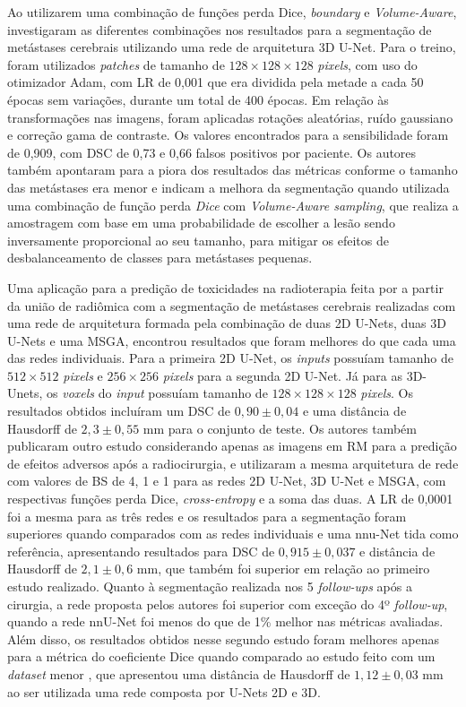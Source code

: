 Ao utilizarem uma combinação de funções perda Dice, \textit{boundary} e \textit{Volume-Aware}, \cite{Chartrand:2022} investigaram as diferentes combinações nos resultados para a segmentação de metástases cerebrais utilizando uma rede de arquitetura 3D U-Net. Para o treino, foram utilizados \textit{patches} de tamanho de $128\times128\times128$ \textit{pixels}, com uso do otimizador Adam, com LR de 0,001 que era dividida pela metade a cada 50 épocas sem variações, durante um total de 400 épocas. Em relação às transformações nas imagens, foram aplicadas rotações aleatórias, ruído gaussiano e correção gama de contraste. Os valores encontrados para a sensibilidade foram de 0,909, com DSC de 0,73 e 0,66 falsos positivos por paciente. Os autores também apontaram para a piora dos resultados das métricas conforme o tamanho das metástases era menor e indicam a melhora da segmentação quando utilizada uma combinação de função perda \textit{Dice} com \textit{Volume-Aware sampling}, que realiza a amostragem com base em uma probabilidade de escolher a lesão sendo inversamente proporcional ao seu tamanho, para mitigar os efeitos de desbalanceamento de classes para metástases pequenas.

Uma aplicação para a predição de toxicidades na radioterapia feita por \cite{Jalalifar:2022} a partir da união de radiômica com a segmentação de metástases cerebrais realizadas com uma rede de arquitetura formada pela combinação de duas 2D U-Nets, duas 3D U-Nets e uma MSGA, encontrou resultados que foram melhores do que cada uma das redes individuais. Para a primeira 2D U-Net, os \textit{inputs} possuíam tamanho de $512\times512$ \textit{pixels} e $256\times256$ \textit{pixels} para a segunda 2D U-Net. Já para as 3D-Unets, os \textit{voxels} do \textit{input} possuíam tamanho de $128\times128\times128$ \textit{pixels}. Os resultados obtidos incluíram um DSC de $0,90 \pm 0,04$ e uma distância de Hausdorff de $2,3 \pm 0,55$ mm para o conjunto de teste. Os autores também publicaram outro estudo \cite{Jalalifar:2023} considerando apenas as imagens em RM para a predição de efeitos adversos após a radiocirurgia, e utilizaram a mesma arquitetura de rede com valores de BS de 4, 1 e 1 para as redes 2D U-Net, 3D U-Net e MSGA, com respectivas funções perda Dice, \textit{cross-entropy} e a soma das duas. A LR de 0,0001 foi a mesma para as três redes e os resultados para a segmentação foram superiores quando comparados com as redes individuais e uma nnu-Net tida como referência, apresentando resultados para DSC de $0,915 \pm 0,037$ e distância de Hausdorff de $2,1 \pm 0,6$ mm, que também foi superior em relação ao primeiro estudo realizado. Quanto à segmentação realizada nos 5 \textit{follow-ups} após a cirurgia, a rede proposta pelos autores foi superior com exceção do 4º \textit{follow-up}, quando a rede nnU-Net foi menos do que de 1\% melhor nas métricas avaliadas. Além disso, os resultados obtidos nesse segundo estudo foram melhores apenas para a métrica do coeficiente Dice quando comparado ao estudo feito com um \textit{dataset} menor \cite{Jalalifar:2020}, que apresentou uma distância de Hausdorff de $1,12 \pm 0,03$ mm ao ser utilizada uma rede composta por U-Nets 2D e 3D.

